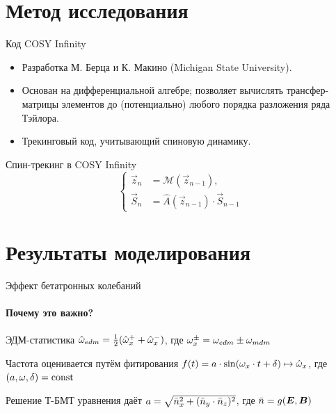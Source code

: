 \documentclass[14pt]{beamer}
\begin{document}
\section{Метод исследования}
\begin{frame}{Код COSY Infinity}
	\begin{itemize}
		\item Разработка М. Берца и К. Макино (Michigan State University).
		\item Основан на дифференциальной алгебре; позволяет вычислять трансфер-матрицы элементов до (потенциально) любого порядка разложения ряда Тэйлора.
		\item Трекинговый код, учитывающий спиновую динамику.
	\end{itemize}
\end{frame}
\begin{frame}{Спин-трекинг в COSY Infinity} 
	\[
	\begin{cases}
	\vec{z}_n &= \mathcal{M}(\vec{z}_{n-1}), \\
	\vec{S}_n &= \hat A(\vec z_{n-1})\cdot \vec S_{n-1}
	\end{cases}
	\]
\end{frame}

\section{Результаты моделирования}
\begin{frame}{Эффект бетатронных колебаний}
\framesubtitle{Почему это важно?}
\begin{block}{ЭДМ-статистика}
	$\hat{\omega}_{edm} = \frac12(\hat{\omega}_x^+ + \hat{\omega}_x^-)$, где $\omega_x^\pm = \omega_{edm} \pm \omega_{mdm}$
\end{block}
\begin{block}{Частота оценивается путём фитирования}
	$f(t) = a\cdot\sin(\omega_x\cdot t + \delta) \mapsto \hat{\omega}_x$, где $(a,\omega, \delta) = \mathrm{const}$
\end{block}
\begin{block}{Решение Т-БМТ уравнения даёт}
	$a = \sqrt{\bar n_x^2 + (\bar n_y\cdot\bar n_z)^2}$, где $\bar n = g(\boldsymbol E, \boldsymbol B)$
\end{block}
\end{frame}
\end{document}
